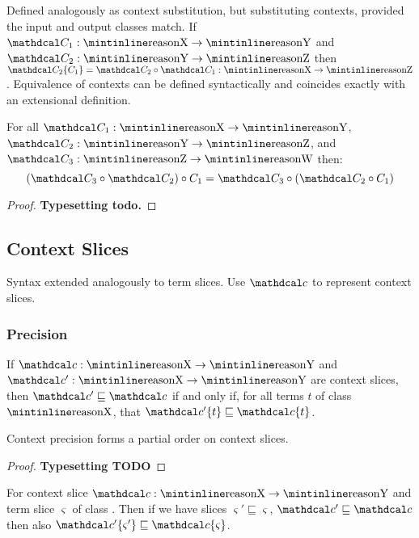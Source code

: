 \begin{definition}
Defined analogously as context substitution, but substituting contexts, provided the input and output classes match. If $\C_1 : \code{X} \to \code{Y}$ and $\C_2 : \code{Y} \to \code{Z}$ then $\C_2\{C_1\} = \C_2 \circ \C_1 : \code{X} \to \code{Z}$. Equivalence of contexts can be defined syntactically and coincides exactly with an extensional definition.
\end{definition}
\begin{proposition}
For all $\C_1 : \code{X} \to \code{Y}$, $\C_2 : \code{Y} \to \code{Z}$, and $\C_3 : \code{Z} \to \code{W}$ then:
\[(\C_3 \circ \C_2) \circ C_1 = \C_3 \circ (\C_2 \circ C_1)\]
\end{proposition}
\begin{proof}
\textbf{Typesetting todo.}
\end{proof}

\subsection{Context Slices}
Syntax extended analogously to term slices. Use $\Cs$ to represent context slices.

\subsubsection{Precision}
\begin{definition}\label{def:ContextPrecisionAppendix}
If $\Cs : \code{X} \to \code{Y}$ and $\Cs' : \code{X} \to \code{Y}$ are context slices, then $\Cs' \sqsubseteq \Cs$ if and only if, for all terms $t$ of class $\code{X}$, that $\Cs'\{t\} \sqsubseteq \Cs\{t\}$.
\end{definition}
\begin{proposition}
Context precision forms a partial order on context slices.
\end{proposition}
\begin{proof}
\textbf{Typesetting TODO}
\end{proof}
\begin{conjecture}
For context slice $\Cs : \code{X} \to \code{Y}$ and term slice $\varsigma$ of class . Then if we have slices $\varsigma' \sqsubseteq \varsigma$, $\Cs' \sqsubseteq \Cs$ then also $\Cs'\{\varsigma'\} \sqsubseteq \Cs\{\varsigma\}$.
\end{conjecture}

